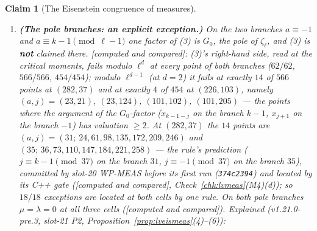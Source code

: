 \documentclass[11pt]{article}
\newtheorem{claim}[theorem]{Claim}
\theoremstyle{remark}
\newcommand{\Z}{\mathbb{Z}}
\newcommand{\Q}{\mathbb{Q}}
\newcommand{\Ga}{\Gamma}
\newcommand{\PROVED}{\textsf{[proved here]}}
\newcommand{\STD}{\textsf{[standard, reference]}}
\newcommand{\CMPD}{\textsf{[computed and compared]}}   %
\newcommand{\Ucite}[1]{[U,~\texttt{#1}]}               %
\begin{document}
\begin{claim}[The Eisenstein congruence of measures]
\begin{enumerate}
  \[
    \mathcal L^{-}_{f,a}(T)\;\equiv\;-s\;G_{a+1}\bigl(u(1+T)-1\bigr)\;G_{k-1-a}\bigl(u^{k-1}(1+T)^{-1}-1\bigr)\pmod{\ell^{d}},
  \]
  $\mathcal L^{-}_{f,a}$ the branch series of $\mu_{r^{-}}$ (Proposition~\ref{prop:lvmtt}(5)), $G_b$ of \Ucite{lem:u-twistvalues}: as whole elements of $\Z/\ell^{d}[\Ga_u/\Ga_u^{\ell^{M-1}}]$ at
  level $M=3$ ($37$) and $M=2$ ($103$) ($16/16$, $16/16$, $49/49$ branches), and at every critical moment $T=u^{j}-1$, $0\le j\le n$, against exact twisted Bernoulli numbers
  ($0$ failures in $496$, $4528$, $11123$). The group-ring form is stronger than the moments: at $n=30$ the $31$ critical values fix a series only modulo $(\ell,X^{31})$
  (\Ucite{thm:u-interp}). Negative control: the wrong twist $G_{a+3}$ matches $0/78$ branches. \emph{A second derivation} (v1.21.0-pre.3, slot-21 P2; no tag moves): by the reduction above,
  $\mathcal L^{-}_{f,a}\equiv s\,\mathcal L^{\mathrm{poly}}_{a}\pmod{\ell^{d}}$, $\mathcal L^{\mathrm{poly}}$ the branch series of $\mu^{(1)}_{P^{\mathrm{Eis}}}$; P2 computes
  $\mathcal L^{\mathrm{poly}}_a\equiv\mathcal L^{\mathrm{Eis}}_a\pmod{\ell^{d}}$ off the pole branches (to depth exactly $d$; Proposition~\ref{prop:lveismeas}(5), \CMPD) and
  $\mathcal L^{\mathrm{Eis}}_a=-G_{a+1}(u(1+T)-1)\,G_{k-1-a}(u^{k-1}(1+T)^{-1}-1)$ exactly in $\Lambda\otimes\Q$ (Proposition~\ref{prop:lveismeas}(3), \PROVED{} given \STD), which gives (3) at every cell
  where (2) and that comparison hold.
\item \textbf{(The pole branches: an explicit exception.)} On the two branches $a\equiv-1$ and $a\equiv k-1\pmod{\ell-1}$ one factor of (3) is $G_0$, the pole of $\zeta_\ell$, and (3)
  is \textbf{not} claimed there. \CMPD: (3)'s right-hand side, read at the critical moments, fails modulo $\ell^{d}$ at every point of both branches ($62/62$, $566/566$, $454/454$);
  modulo $\ell^{d-1}$ (at $d=2$) it fails at exactly $14$ of $566$ points at $(282,37)$ and at exactly $4$ of $454$ at $(226,103)$, namely $(a,j)=(23,21)$, $(23,124)$, $(101,102)$,
  $(101,205)$ --- the points where the argument of the $G_0$-factor ($x_{k-1-j}$ on the branch $k-1$, $x_{j+1}$ on the branch $-1$) has valuation $\ge2$. At $(282,37)$ the $14$
  points are $(a,j)=(31;\,24,61,98,135,172,209,246)$ and $(35;\,36,73,110,147,184,221,258)$ --- the rule's prediction ($j\equiv k-1\pmod{37}$ on the branch $31$, $j\equiv-1\pmod{37}$
  on the branch $35$), committed by slot-20 WP-MEAS before its first run (\texttt{374c2394}) and located by its C++ gate (\CMPD, Check~\ref{chk:lvmeas}(M4)(d)); so $18/18$ exceptions are
  located at both cells by one rule. On both pole branches $\mu=\lambda=0$ at all three cells (\CMPD). \emph{Explained} (v1.21.0-pre.3, slot-21 P2, Proposition~\ref{prop:lveismeas}(4)--(6)):

\end{enumerate}
\end{claim}
\end{document}
